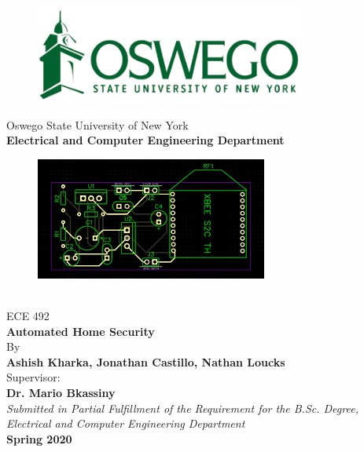 \begin{center}
	\begin{figure}[h]
		\centering
		\includegraphics[width=3.5in]{oswegoHead.png}
	\end{figure}
	\vspace{0.5in}
	\Large
	Oswego State University of New York \\ 
	\textbf{Electrical and Computer Engineering Department}
	\vspace{0.5in}
	\begin{figure}[h]
		\centering
		\includegraphics[width=3in]{power supply pcb w xbee.JPG}
	\end{figure}\\
	\Huge ECE 492 \\
	\textbf{Automated Home Security}\\

	\vspace{1in}
	\normalsize
	By \\
	\Large \textbf{Ashish Kharka, Jonathan Castillo, Nathan Loucks} \\ 
	\vspace{0.5in}
	\normalsize Supervisor:\\
	\Large\textbf{Dr. Mario Bkassiny} \\
	\vspace{0.5in}
	\normalsize\textit{
		Submitted in Partial Fulfillment of the Requirement for the B.Sc. Degree, 	\\Electrical and Computer Engineering Department
		} \\
	\vspace{0.5in}
	\Large\textbf{Spring 2020}
\end{center}